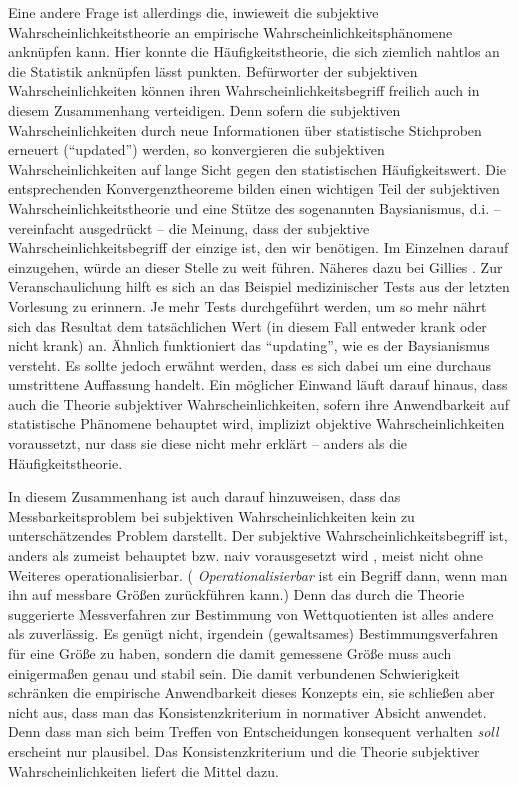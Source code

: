 Eine andere Frage ist allerdings die, inwieweit die subjektive
Wahrscheinlichkeitstheorie an empirische Wahrscheinlichkeitsphänomene anknüpfen
kann. Hier konnte die Häufigkeitstheorie, die sich ziemlich nahtlos an die
Statistik anknüpfen lässt punkten. Befürworter der subjektiven
Wahrscheinlichkeiten können ihren Wahrscheinlichkeitsbegriff freilich 
auch in diesem Zusammenhang verteidigen. Denn sofern die subjektiven
Wahrscheinlichkeiten durch neue Informationen über statistische Stichproben
erneuert ("`updated"') werden, so konvergieren die subjektiven
Wahrscheinlichkeiten auf lange Sicht gegen den statistischen Häufigkeitswert.
Die entsprechenden Konvergenztheoreme bilden einen wichtigen Teil der
subjektiven Wahrscheinlichkeitstheorie und eine Stütze des sogenannten
Baysianismus, d.i. -- vereinfacht ausgedrückt -- die Meinung, dass der
subjektive Wahrscheinlichkeitsbegriff der einzige ist, den wir benötigen.
Im Einzelnen darauf einzugehen, würde an dieser Stelle zu weit führen. Näheres
dazu bei Gillies \cite[]{gillies:2000}. Zur Veranschaulichung hilft es sich an
das Beispiel medizinischer Tests aus der letzten Vorlesung zu erinnern. Je mehr
Tests durchgeführt werden, um so mehr nährt sich das Resultat dem tatsächlichen
Wert (in diesem Fall entweder krank oder nicht krank) an. Ähnlich funktioniert
das "`updating"', wie es der Baysianismus versteht. Es sollte jedoch erwähnt
werden, dass es sich dabei um eine durchaus umstrittene Auffassung handelt.
Ein möglicher Einwand läuft darauf hinaus, dass auch die Theorie subjektiver
Wahrscheinlichkeiten, sofern ihre Anwendbarkeit auf statistische Phänomene behauptet wird, 
implizizt objektive Wahrscheinlichkeiten voraussetzt, nur dass sie diese nicht
mehr erklärt -- anders als die Häufigkeitstheorie.

In diesem Zusammenhang ist auch darauf hinzuweisen, dass das
Messbarkeitsproblem bei subjektiven Wahrscheinlichkeiten kein zu
unterschätzendes Problem darstellt. Der subjektive Wahrscheinlichkeitsbegriff
ist, anders als zumeist behauptet bzw. naiv vorausgesetzt wird \cite[p.
69]{gillies:2000}, meist nicht ohne Weiteres operationalisierbar. ({\em
Operationalisierbar} ist ein Begriff dann, wenn man ihn auf messbare Größen
zurückführen kann.) Denn das durch die Theorie suggerierte Messverfahren zur
Bestimmung von Wettquotienten ist alles andere als zuverlässig. Es genügt
nicht, irgendein (gewaltsames) Bestimmungsverfahren für eine Größe zu haben,
sondern die damit gemessene Größe muss auch einigermaßen genau und stabil sein.
Die damit verbundenen Schwierigkeit schränken die empirische Anwendbarkeit
dieses Konzepts ein, sie schließen aber nicht aus, dass man das
Konsistenzkriterium in normativer Absicht anwendet. Denn dass man sich beim
Treffen von Entscheidungen konsequent verhalten {\em soll} erscheint nur
plausibel. Das Konsistenzkriterium und die Theorie subjektiver
Wahrscheinlichkeiten liefert die Mittel dazu.

